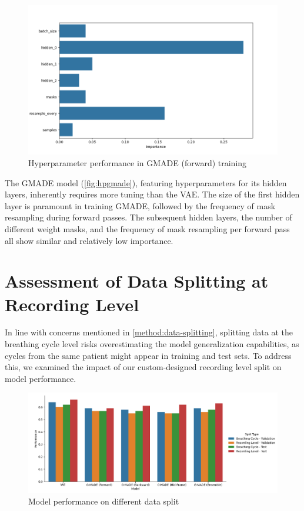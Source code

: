 \begin{figure}[h!]
    \includegraphics[width=\linewidth]{images/importances_gmade}
    \caption{
    Hyperparameter performance in GMADE (forward) training
}
\label{fig:hpgmade}
\end{figure}

The GMADE model (\autoref{fig:hpgmade}), featuring hyperparameters for its hidden layers, inherently requires more tuning than the VAE. The size of the first hidden layer is paramount in training GMADE, followed by the frequency of mask resampling during forward passes. The subsequent hidden layers, the number of different weight masks, and the frequency of mask resampling per forward pass all show similar and relatively low importance.

\section{Assessment of Data Splitting at Recording Level}
In line with concerns mentioned in \autoref{method:data-splitting}, splitting data at the breathing cycle level risks overestimating the model generalization capabilities, as cycles from the same patient might appear in training and test sets. To address this, we examined the impact of our custom-designed recording level split on model performance.

\begin{figure}[h!]
    \includegraphics[width=\linewidth]{images/split_performance}
    \caption{
    Model performance on different data split
}
\label{fig:split}
\end{figure}

